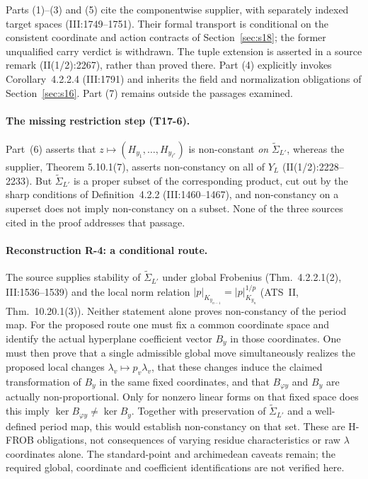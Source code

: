 \documentclass[11pt,a4paper]{article}
\theoremstyle{definition}
\theoremstyle{remark}
\begin{document}
Parts (1)--(3) and (5) cite the componentwise supplier, with separately
indexed target spaces (III:1749--1751). Their formal transport is conditional
on the consistent coordinate and action contracts of Section~\ref{sec:s18};
the former unqualified carry verdict is withdrawn. The tuple extension is
asserted in a source remark (II(1/2):2267), rather than proved there.
Part (4) explicitly invokes Corollary~4.2.2.4 (III:1791) and inherits the
field and normalization obligations of Section~\ref{sec:s16}. Part (7)
remains outside the passages examined.

\paragraph{The missing restriction step (T17-6).} Part~(6) asserts that
$z \mapsto (H_{y_1},\dots,H_{y_{\ell^*}})$ is non-constant \emph{on}
$\widetilde{\Sigma}_{L'}$, whereas the supplier, Theorem 5.10.1(7), asserts
non-constancy on all of $Y_L$ (II(1/2):2228--2233). But $\widetilde{\Sigma}_{L'}$
is a proper subset of the corresponding product, cut out by the sharp conditions
of Definition~4.2.2 (III:1460--1467), and non-constancy on a superset does not
imply non-constancy on a subset. None of the three sources cited in the proof
addresses that passage.

\paragraph{Reconstruction R-4: a conditional route.}
The source supplies stability of $\widetilde\Sigma_{L'}$ under global
Frobenius (Thm.~4.2.2.1(2), III:1536--1539) and the local norm relation
$|p|_{K_{y_{n-1}}}=|p|_{K_{y_n}}^{1/p}$ (ATS~II, Thm.~10.20.1(3)).
Neither statement alone proves non-constancy of the period map.
For the proposed route one must fix a common coordinate space and identify
the actual hyperplane coefficient vector $B_y$ in those coordinates.
One must then prove that a single admissible global move simultaneously
realizes the proposed local changes $\lambda_v\mapsto p_v\lambda_v$, that
these changes induce the claimed transformation of $B_y$ in the same
fixed coordinates, and that $B_{\varphi y}$ and $B_y$ are actually
non-proportional. Only for nonzero linear forms on that fixed space does
this imply $\ker B_{\varphi y}\ne\ker B_y$. Together with preservation of
$\widetilde\Sigma_{L'}$ and a well-defined period map, this would establish
non-constancy on that set. These are H-FROB obligations, not consequences
of varying residue characteristics or raw $\lambda$ coordinates alone.
The standard-point and archimedean caveats remain; the required global,
coordinate and coefficient identifications are not verified here.
\end{document}
